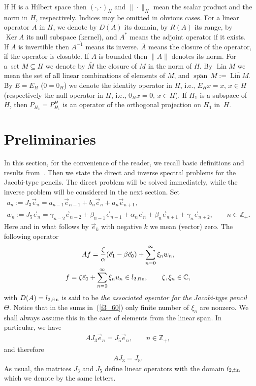 \documentclass[pdftex]{sigma}
\numberwithin{equation}{section}
\begin{document}
If H is a Hilbert space then $(\cdot,\cdot)_H$ and $\| \cdot \|_H$ mean the scalar product and the norm in $H$, respectively. Indices may be omitted in obvious cases. For a linear operator $A$ in $H$, we denote by $D(A)$ its domain, by $R(A)$ its range, by $\operatorname{Ker} A$ its null subspace (kernel), and $A^*$ means the adjoint operator if it exists. If $A$ is invertible then $A^{-1}$ means its inverse. $\overline{A}$ means the closure of the operator, if the operator is closable. If $A$ is bounded then $\| A \|$ denotes its norm. For a~set $M\subseteq H$ we denote by $\overline{M}$ the closure of $M$ in the norm of $H$. By $\operatorname{Lin} M$ we mean the set of all linear combinations of elements of $M$, and $\overline{\operatorname{span}}\, M := \overline{\operatorname{Lin} M}$. By $E=E_H$ ($0=0_H$) we denote the identity operator in $H$, i.e., $E_H x = x$, $x\in H$ (respectively the null operator in $H$, i.e., $0_H x = 0$, $x\in H$). If $H_1$ is a subspace of $H$, then $P_{H_1} = P_{H_1}^{H}$ is an operator of the orthogonal projection on $H_1$ in~$H$.

\section{Preliminaries}

In this section, for the convenience of the reader, we recall basic def\/initions and results from~\cite{cit_95000_Z}. Then we state the direct and inverse spectral problems for the Jacobi-type pencils. The direct problem will be solved immediately, while the inverse problem will be considered in the next section. Set
\begin{gather*}
u_n := J_3 \vec e_n = a_{n-1} \vec e_{n-1} + b_n \vec e_n + a_n \vec e_{n+1}, \\
w_n := J_5 \vec e_n = \gamma_{n-2} \vec e_{n-2} + \beta_{n-1} \vec e_{n-1} + \alpha_n \vec e_n + \beta_n \vec e_{n+1}+ \gamma_n \vec e_{n+2},\qquad n\in\mathbb{Z}_+.
\end{gather*}
Here and in what follows by $\vec e_k$ with negative $k$ we mean (vector) zero. The following operator
\begin{gather} A f = \frac{\zeta}{\alpha} (\vec e_1 - \beta \vec e_0) + \sum_{n=0}^\infty \xi_n w_n, \notag \\
f = \zeta \vec e_0 + \sum_{n=0}^\infty \xi_n u_n\in l_{2,{\rm f\/in}},\qquad \zeta, \xi_n\in\mathbb{C}, \label{f3_60}
\end{gather}
with $D(A) = l_{2,{\rm f\/in}}$ is said to be \textit{the associated operator for the Jacobi-type pencil $\Theta$}. Notice that in the sums in~(\ref{f3_60}) only f\/inite number of $\xi_n$ are nonzero. We shall always assume this in the case of elements from the linear span. In particular, we have
\begin{gather*} A J_3 \vec e_n = J_5 \vec e_n,\qquad n\in\mathbb{Z}_+, \end{gather*}
and therefore
\begin{gather*} A J_3 = J_5. \end{gather*}
As usual, the matrices $J_3$ and $J_5$ def\/ine linear operators with the domain $l_{2,{\rm f\/in}}$ which we denote by the same letters.
\end{document}
